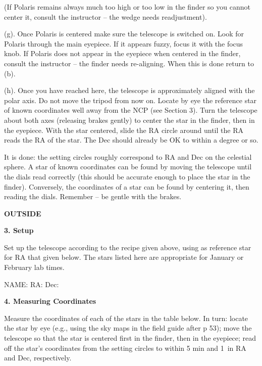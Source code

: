 \medskip
\noindent
(If Polaris remains always much too high or too low in the finder so
you cannot center it, consult the instructor -- the wedge needs
readjustment).

\medskip\noindent
(g). Once Polaris is centered make sure the telescope is switched
on. Look for Polaris through the main eyepiece. If it appears fuzzy,
focus it with the focus knob. If Polaris does not appear in the
eyepiece when centered in the finder, consult the instructor -- the
finder needs re-aligning. When this is done return to (b).

\medskip\noindent
(h). Once you have reached here, the telescope is approximately
aligned with the polar axis. Do not move the tripod from now on. Locate by
eye the reference star of known coordinates well away from the NCP
(see Section 3). Turn the telescope about both axes (releasing brakes
gently) to center the star in the finder, then in the eyepiece.
With the star centered, slide the RA circle around until the RA reads
the RA of the star. The Dec should already be OK to within a degree or
so.

\medskip\noindent
It is done: the setting circles roughly correspond to RA and
Dec on the celestial sphere. A star of known coordinates can be found
by moving the telescope until the dials read correctly (this should
be accurate enough to place the star in the finder). Conversely, the
coordinates of a star can be found by centering it, then reading the
dials. Remember -- be gentle with the brakes.


\noindent
{\bf OUTSIDE}

\bigskip
\noindent
{\bf 3. Setup}

\medskip\noindent
Set up the telescope according to the recipe given above, using as
reference star for RA that given below. The stars listed here are
appropriate for January or February lab times.

\medskip\begin{center}
NAME:  RA:   Dec:
\end{center}

\bigskip\noindent
{\bf 4. Measuring Coordinates}

\medskip\noindent
Measure the coordinates of each of the stars in the table below. In
turn: locate the star by eye (e.g., using the sky maps in the field
guide after p 53); move the telescope so that the star is centered
first in the finder, then in the eyepiece; read off the star's
coordinates from the setting circles to within 5 min and 1\deg\ in RA
and Dec, respectively.

